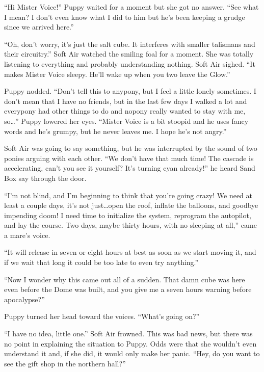 ``Hi Mister Voice!'' Puppy waited for a moment but she got no answer. ``See what I mean? I don't even know what I did to him but he's been keeping a grudge since we arrived here.''

``Oh, don't worry, it's just the salt cube. It interferes with smaller talismans and their circuitry.'' Soft Air watched the smiling foal for a moment. She was totally listening to everything and probably understanding nothing. Soft Air sighed. ``It makes Mister Voice sleepy. He'll wake up when you two leave the Glow.''

Puppy nodded. ``Don't tell this to anypony, but I feel a little lonely sometimes. I don't mean that I have no friends, but in the last few days I walked a lot and everypony had other things to do and nopony really wanted to stay with me, so\dots'' Puppy lowered her eyes. ``Mister Voice is a bit stoopid and he uses fancy words and he's grumpy, but he never leaves me. I hope he's not angry.''

Soft Air was going to say something, but he was interrupted by the sound of two ponies arguing with each other. ``We don't have that much time! The cascade is accelerating, can't you see it yourself? It's turning cyan already!'' he heard Sand Box say through the door.

``I'm not blind, and I'm beginning to think that you're going crazy! We need at least a couple days, it's not just\dots open the roof, inflate the balloons, and goodbye impending doom! I need time to initialize the system, reprogram the autopilot, and lay the course. Two days, maybe thirty hours, with no sleeping at all,'' came a mare's voice.

``It will release in seven or eight hours at best as soon as we start moving it, and if we wait that long it could be too late to even try anything.''

``Now I wonder why this came out all of a sudden. That damn cube was here even before the Dome was built, and you give me a seven hours warning before apocalypse?''

Puppy turned her head toward the voices. ``What's going on?''

``I have no idea, little one.'' Soft Air frowned. This was bad news, but there was no point in explaining the situation to Puppy. Odds were that she wouldn't even understand it and, if she did, it would only make her panic. ``Hey, do you want to see the gift shop in the northern hall?''


\horizonline

